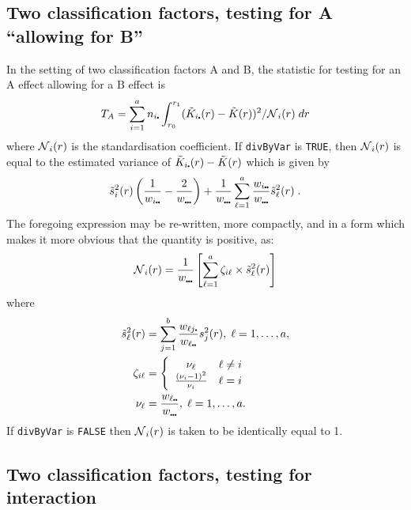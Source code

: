 \documentclass[12pt]{article}
\newcommand{\pt}{\mbox{\scalebox{0.4}{$\bullet$}}}
\newcommand{\tils}{\mbox{$\tilde{s}$}}
\newcommand{\sco}{\mbox{$\cal N$}}
\begin{document}
\subsection{Two classification factors, testing for A ``allowing for B''}
\label{sec:teststats.testForA}
In the setting of two classification factors A and B, the statistic
for testing for an A effect allowing for a B effect is
\[
T_A = \sum_{i=1}^a n_{i \pt} \int_{r_0}^{r_1} (\tilde{K}_{i \pt}(r) -
                 \tilde{K}(r))^2/\sco_i(r) \; dr
\]
where $\sco_i(r)$ is the standardisation coefficient.  If
\texttt{divByVar} is \texttt{TRUE}, then $\sco_i(r)$ is equal
to the estimated variance of $\tilde{K}_{i \pt}(r) - \tilde{K}(r)$
which is given by
\[
\tils_i^2(r) \left ( \frac{1}{w_{i \pt \pt}} - \frac{2}{w_{\pt \pt \pt}}
                      \right ) + \frac{1}{w_{\pt \pt \pt}} \sum_{\ell=1}^a
                      \frac{w_{i \pt \pt}}{w_{\pt \pt \pt}} \tils_{\ell}^2(r) \; .
\]
The foregoing expression may be re-written, more compactly, and in a form which
makes it more obvious that the quantity is positive, as:
\[
\sco_i(r) = \frac{1}{w_{\pt \pt \pt}} \left [
            \sum_{\ell=1}^a \zeta_{i \ell} \times \tils^2_{\ell}(r) \right ]
\]
where
\begin{align*}
\tils^2_{\ell}(r) &= \sum_{j=1}^b \frac{w_{\ell j\pt}}{w_{\ell \pt \pt}} s_j^2(r),
\; \ell = 1, \ldots, a, \\
\zeta_{i \ell} &= \left \{ \begin{array}{cl}
               \nu_{\ell} & \ell \neq i \\
               \frac{(\nu_i - 1)^2}{\nu_i} & \ell = i 
               \end{array} \right . \\
\nu_{\ell} &= \frac{w_{\ell \pt \pt}}{w_{\pt \pt \pt}}, \;
\ell = 1, \ldots, a.
\end{align*}
If \texttt{divByVar} is \texttt{FALSE} then $\sco_i(r)$ is taken to
be identically equal to 1.

\subsection{Two classification factors, testing for interaction}
\label{sec:teststats.testForInterac}
\end{document}
